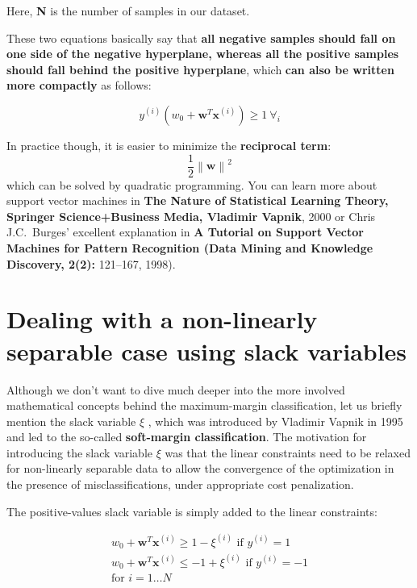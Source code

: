\documentclass[11pt]{article}
\newcommand{\norm}[1]{\left\lVert#1\right\rVert}
\newcommand{\vect}[1]{\boldsymbol{#1}}
\begin{document}
    Here, \textbf{N} is the number of samples in our dataset.

    These two equations basically say that \textbf{all negative samples should fall on one side of the negative hyperplane,
    whereas all the positive samples should fall behind the positive hyperplane}, which \textbf{can also be written more
    compactly} as follows:

    \begin{equation}
        \label{eq:svm_cons_comp}
        y^{(i)} \left( w_0 + \vect{w}^T \vect{x}^{(i)} \right) \geq 1 ~ \forall_i
    \end{equation}

    In practice though, it is easier to minimize the \textbf{reciprocal term}:
    \begin{equation}
        \label{eq:svm_margin_reciprocal}
        \frac{1} {2} \norm{\vect{w}}^2
    \end{equation}
    which can be solved by quadratic programming.
    You can learn more about support vector machines in \textbf{The Nature of Statistical Learning Theory,
    Springer Science+Business Media, Vladimir Vapnik}, 2000 or Chris J.C.\ Burges' excellent explanation in
    \textbf{A Tutorial on Support Vector Machines for Pattern Recognition (Data Mining and Knowledge Discovery,
    2(2):} 121--167, 1998).

    \section{Dealing with a non-linearly separable case using slack variables} \label{sec:slack_vars}

    Although we don't want to dive much deeper into the more involved mathematical concepts behind the maximum-margin
    classification, let us briefly mention the slack variable $\xi$ , which was introduced by Vladimir Vapnik in
    1995 and led to the so-called \textbf{soft-margin classification}.
    The motivation for introducing the slack variable $\xi$ was that the linear constraints need to be relaxed for
    non-linearly separable data to allow the convergence of the optimization in the presence of misclassifications,
    under appropriate cost penalization.

    The positive-values slack variable is simply added to the linear constraints:

    \begin{equation}
        \label{eq:svm_constraints_slack}
        \begin{gathered}
            w_0 + \boldsymbol{w}^T \boldsymbol{x}^{(i)} \geq 1 - \xi^{(i)} \text{ if } y^{(i)} = 1 \\
            w_0 + \boldsymbol{w}^T \boldsymbol{x}^{(i)} \leq - 1 + \xi^{(i)} \text{ if } y^{(i)} = -1 \\
            \text{for } i=1 \dots N
        \end{gathered}
    \end{equation}
\end{document}
